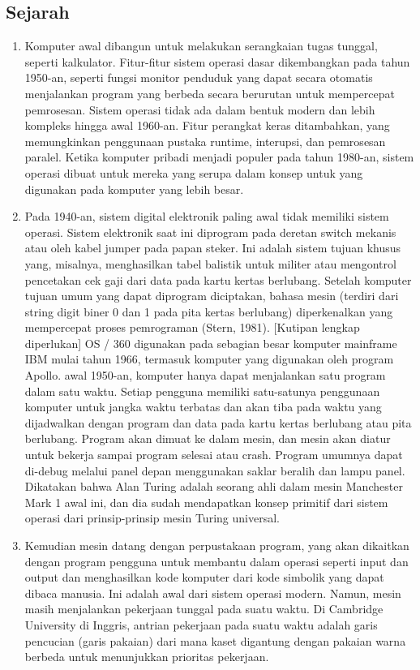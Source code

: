 \subsection{Sejarah}
\begin{enumerate}
\item Komputer awal dibangun untuk melakukan serangkaian tugas tunggal, seperti kalkulator. Fitur-fitur sistem operasi dasar dikembangkan pada tahun 1950-an, seperti fungsi monitor penduduk yang dapat secara otomatis menjalankan program yang berbeda secara berurutan untuk mempercepat pemrosesan. Sistem operasi tidak ada dalam bentuk modern dan lebih kompleks hingga awal 1960-an. Fitur perangkat keras ditambahkan, yang memungkinkan penggunaan pustaka runtime, interupsi, dan pemrosesan paralel. Ketika komputer pribadi menjadi populer pada tahun 1980-an, sistem operasi dibuat untuk mereka yang serupa dalam konsep untuk yang digunakan pada komputer yang lebih besar.
\item Pada 1940-an, sistem digital elektronik paling awal tidak memiliki sistem operasi. Sistem elektronik saat ini diprogram pada deretan switch mekanis atau oleh kabel jumper pada papan steker. Ini adalah sistem tujuan khusus yang, misalnya, menghasilkan tabel balistik untuk militer atau mengontrol pencetakan cek gaji dari data pada kartu kertas berlubang. Setelah komputer tujuan umum yang dapat diprogram diciptakan, bahasa mesin (terdiri dari string digit biner 0 dan 1 pada pita kertas berlubang) diperkenalkan yang mempercepat proses pemrograman (Stern, 1981). [Kutipan lengkap diperlukan]
OS / 360 digunakan pada sebagian besar komputer mainframe IBM mulai tahun 1966, termasuk komputer yang digunakan oleh program Apollo.
\itemPada awal 1950-an, komputer hanya dapat menjalankan satu program dalam satu waktu. Setiap pengguna memiliki satu-satunya penggunaan komputer untuk jangka waktu terbatas dan akan tiba pada waktu yang dijadwalkan dengan program dan data pada kartu kertas berlubang atau pita berlubang. Program akan dimuat ke dalam mesin, dan mesin akan diatur untuk bekerja sampai program selesai atau crash. Program umumnya dapat di-debug melalui panel depan menggunakan saklar beralih dan lampu panel. Dikatakan bahwa Alan Turing adalah seorang ahli dalam mesin Manchester Mark 1 awal ini, dan dia sudah mendapatkan konsep primitif dari sistem operasi dari prinsip-prinsip mesin Turing universal.
\item Kemudian mesin datang dengan perpustakaan program, yang akan dikaitkan dengan program pengguna untuk membantu dalam operasi seperti input dan output dan menghasilkan kode komputer dari kode simbolik yang dapat dibaca manusia. Ini adalah awal dari sistem operasi modern. Namun, mesin masih menjalankan pekerjaan tunggal pada suatu waktu. Di Cambridge University di Inggris, antrian pekerjaan pada suatu waktu adalah garis pencucian (garis pakaian) dari mana kaset digantung dengan pakaian warna berbeda untuk menunjukkan prioritas pekerjaan. 
\end{enumerate}
